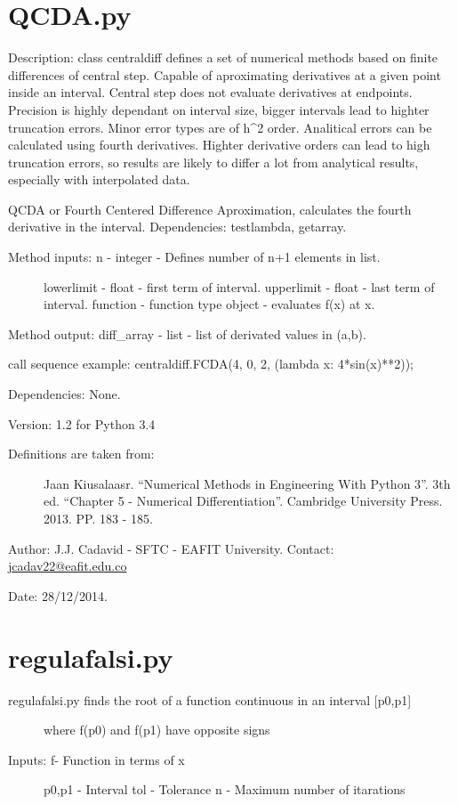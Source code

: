 \documentclass[letterpaper,10pt,oneside]{sphinxmanual}
\theoremstyle{plain}%
\theoremstyle{definition}%
\theoremstyle{remark}%
\begin{document}
\section{QCDA.py}
\label{code:module-QCDA}\label{code:qcda-py}
Description: class centraldiff defines a set of numerical methods based on
finite differences of central step. Capable of aproximating derivatives at
a given point inside an interval. Central step does not evaluate derivatives
at endpoints. Precision is highly dependant on interval size, bigger intervals
lead to highter truncation errors. Minor error types are of h\textasciicircum{}2 order.
Analitical errors can be calculated using fourth derivatives. Highter
derivative orders can lead to high truncation errors, so results are likely
to differ a lot from analytical results, especially with interpolated data.

QCDA or Fourth Centered Difference Aproximation, calculates the fourth
derivative in the interval. Dependencies: testlambda, getarray.
\begin{description}
\item[{Method inputs: n - integer - Defines number of n+1 elements in list.}] \leavevmode
lowerlimit - float - first term of interval.
upperlimit - float - last term of interval.
function - function type object - evaluates f(x) at x.

\end{description}

Method output: diff\_array - list - list of derivated values in (a,b).

call sequence example: centraldiff.FCDA(4, 0, 2, (lambda x: 4*sin(x)**2));

Dependencies: None.

Version: 1.2 for Python 3.4
\begin{description}
\item[{Definitions are taken from:}] \leavevmode
Jaan Kiusalaasr. ``Numerical Methods in Engineering With Python 3''.
3th ed. ``Chapter 5 - Numerical Differentiation''. 
Cambridge University Press. 2013. PP. 183 - 185.

\end{description}

Author: J.J. Cadavid - SFTC - EAFIT University.
Contact: \href{mailto:jcadav22@eafit.edu.co}{jcadav22@eafit.edu.co}

Date: 28/12/2014.


\section{regulafalsi.py}
\label{code:module-regulafalsi}\label{code:regulafalsi-py}\begin{description}
\item[{regulafalsi.py finds the root of a function continuous in an interval {[}p0,p1{]}}] \leavevmode
where f(p0) and f(p1) have opposite signs

\item[{Inputs: f- Function in terms of x}] \leavevmode
p0,p1 - Interval
tol - Tolerance
n - Maximum number of itarations

\end{description}
\end{document}
